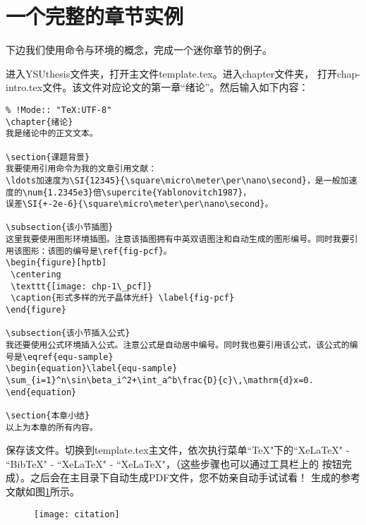 \section{一个完整的章节实例}\label{section1-2}
下边我们使用命令与环境的概念，完成一个迷你章节的例子。

进入YSUthesis文件夹，打开主文件template.tex。进入chapter文件夹，
打开chap-intro.tex文件。该文件对应论文的第一章“绪论”。然后输入如下内容：
\begin{verbatim}
% !Mode:: "TeX:UTF-8"
\chapter{绪论}
我是绪论中的正文文本。

\section{课题背景}
我要使用引用命令为我的文章引用文献：
\ldots加速度为\SI{12345}{\square\micro\meter\per\nano\second}，是一般加速度的\num{1.2345e3}倍\supercite{Yablonovitch1987}，
误差\SI{+-2e-6}{\square\micro\meter\per\nano\second}。

\subsection{该小节插图}
这里我要使用图形环境插图。注意该插图拥有中英双语图注和自动生成的图形编号。同时我要引用该图形：该图的编号是\ref{fig-pcf}。
\begin{figure}[hptb]
 \centering
 \texttt{[image: chp-1\_pcf]}
 \caption{形式多样的光子晶体光纤} \label{fig-pcf}
\end{figure}

\subsection{该小节插入公式}
我还要使用公式环境插入公式。注意公式是自动居中编号。同时我也要引用该公式，该公式的编号是\eqref{equ-sample}
\begin{equation}\label{equ-sample}
\sum_{i=1}^n\sin\beta_i^2+\int_a^b\frac{D}{c}\,\mathrm{d}x=0.
\end{equation}

\section{本章小结}
以上为本章的所有内容。
\end{verbatim}
保存该文件。切换到template.tex主文件，依次执行菜单``TeX"下的``XeLaTeX" - ``BibTeX" - ``XeLaTeX" - ``XeLaTeX"，（这些步骤也可以通过工具栏上的
按钮完成）。之后会在主目录下自动生成PDF文件，您不妨亲自动手试试看！
生成的参考文献如图\ref{fig-ctt}所示。
\begin{figure}[hptb]
 \centering
 \texttt{[image: citation]}
\label{fig-ctt}
\end{figure}

